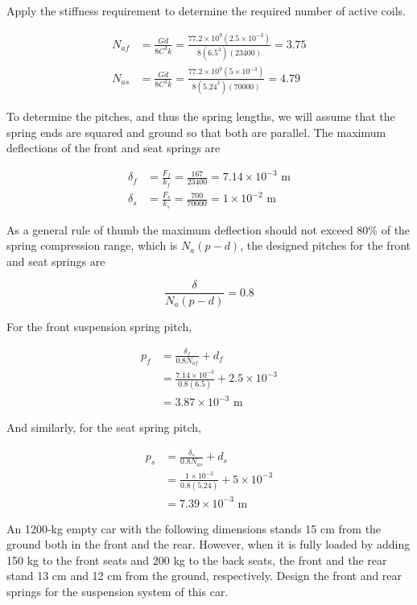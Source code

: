 \documentclass[a4paper,openany,12pt]{book}
\begin{document}
{{Apply the stiffness requirement to determine the required number of
active coils.

$$\begin{aligned}
    N_{af} &= \frac{Gd}{8C^3k} = \frac{77.2 \times 10^9(2.5 \times 10^{-3})}{8(6.5^3)(23400)} = 3.75 \\
    N_{as} &= \frac{Gd}{8C^3k} = \frac{77.2 \times 10^9(5 \times 10^{-3})}{8(5.24^3)(70000)} = 4.79
  \end{aligned}$$

To determine the pitches, and thus the spring lengths, we will assume
that the spring ends are squared and ground so that both are parallel.
The maximum deflections of the front and seat springs are

$$\begin{aligned}
    \delta_f &= \frac{F_f}{k_f} = \frac{167}{23400} = 7.14 \times 10^{-3} \text{ m} \\
    \delta_s &= \frac{F_s}{k_s} = \frac{700}{70000} = 1 \times 10^{-2}\text{ m}
  \end{aligned}$$

As a general rule of thumb the maximum deflection should not exceed 80\%
of the spring compression range, which is \(N_a(p - d)\), the designed
pitches for the front and seat springs are

$$\frac{\delta}{N_a(p - d)} = 0.8$$

For the front suspension spring pitch,

$$\begin{aligned}
    p_f &= \frac{\delta _f}{0.8N_{af}} + d_f \\ 
          &= \frac{7.14 \times 10^{-3}}{0.8(6.5)} + 2.5 \times 10^{-3} \\ 
          &= 3.87 \times 10^{-3} \text{ m}
  \end{aligned}$$

And similarly, for the seat spring pitch,

$$\begin{aligned}
    p_s &= \frac{\delta _s}{0.8N_{as}} + d_s \\ 
          &= \frac{1 \times 10^{-2}}{0.8(5.24)} + 5 \times 10^{-3} \\ 
          &= 7.39 \times 10^{-3}\text{ m}
  \end{aligned}$$

An 1200-kg empty car with the following dimensions stands 15 cm from the
ground both in the front and the rear. However, when it is fully loaded
by adding 150 kg to the front seats and 200 kg to the back seats, the
front and the rear stand 13 cm and 12 cm from the ground, respectively.
Design the front and rear springs for the suspension system of this car.

}}
\end{document}
